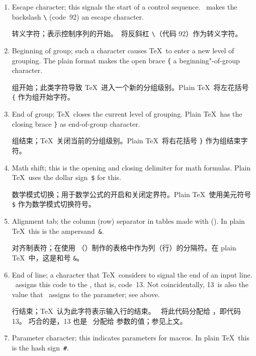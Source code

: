 \begin{enumerate} %
\setcounter{enumi}{-1}
\item\label{ini:esc} Escape character; this signals the start of a control
      sequence. \IniTeX\ makes the backslash \verb-\- (code~92)
      an escape character.

      转义字符；表示控制序列的开始。\IniTeX\ 将反斜杠 \verb-\-（代码 92）作为转义字符。%
\item Beginning of group; such a character causes \TeX\ to enter a new
      level of grouping. The plain format makes the open brace \verb-{-
\mdqon
      a beginning"-of-group character.
\mdqoff

组开始；此类字符导致 \TeX\ 进入一个新的分组级别。Plain \TeX\ 将左花括号 \verb-{-
\mdqon
作为组开始字符。
\mdqoff
\item End of group; \TeX\ closes the current level of grouping.
      Plain \TeX\ has  the closing brace \verb-}- as end-of-group
      character.

      组结束；\TeX\ 关闭当前的分组级别。Plain \TeX\ 将右花括号 \verb-}- 作为组结束字符。
\item Math shift; this is the opening and closing delimiter for
      math formulas. Plain \TeX\ uses the dollar sign~\verb-$-
      for this.

      数学模式切换；用于数学公式的开启和关闭定界符。Plain \TeX\ 使用美元符号 \verb-$-
      作为数学模式切换符号。%
\item Alignment tab; the column (row) separator in tables
      made with  (). In plain
      \TeX\ this is the ampersand~\verb-&-.

      对齐制表符；在使用 （）制作的表格中作为列（行）的分隔符。在 plain
      \TeX\ 中，这是和号 \verb-&-。%
\item\label{ini:eol} End of line; a character that \TeX\ considers
      to signal the
      end of an input line.
      \IniTeX\ assigns this code to the , that is, code~13.
      Not coincidentally, 13~is also the value that \IniTeX\
      assigns to the  parameter; see above.
\awp

行结束；\TeX\ 认为此字符表示输入行的结束。
\IniTeX\ 将此代码分配给 ，即代码 13。
巧合的是，13 也是 \IniTeX\ 分配给  参数的值；参见上文。
\awp%
\item Parameter character; this indicates parameters for macros.
      In plain \TeX\ this is the hash sign~\verb-#-.


\end{enumerate}
